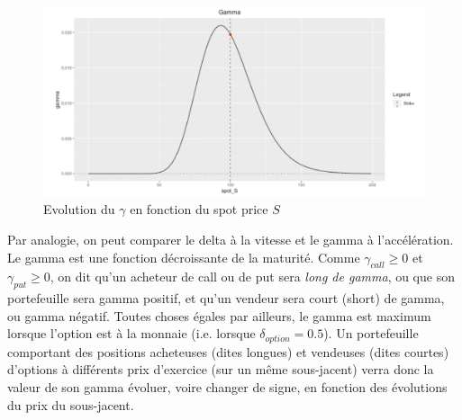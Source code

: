 \documentclass[a4paper]{article}
\begin{document}
\begin{figure}[H]
    \centering
    \includegraphics[scale=0.6]{gamma.png}
    \caption{Evolution du $\gamma$ en fonction du spot price $S$}
    \label{fig:enter-label}
\end{figure}

Par analogie, on peut comparer le delta à la vitesse et le gamma à l'accélération. Le gamma est une fonction décroissante de la maturité. 
Comme $\gamma_{call} \geq 0$ et $\gamma_{put} \geq 0$, on dit qu'un acheteur de call ou de put sera \textit{long de gamma}, ou que son portefeuille sera gamma positif, et qu'un vendeur sera court (short) de gamma, ou gamma négatif. Toutes choses égales par ailleurs, le gamma est maximum lorsque l'option est à la monnaie (i.e. lorsque $\delta_{option} = 0.5$). Un portefeuille comportant des positions acheteuses (dites longues) et vendeuses (dites courtes) d'options à différents prix d'exercice (sur un même sous-jacent) verra donc la valeur de son gamma évoluer, voire changer de signe, en fonction des évolutions du prix du sous-jacent. 
\end{document}
